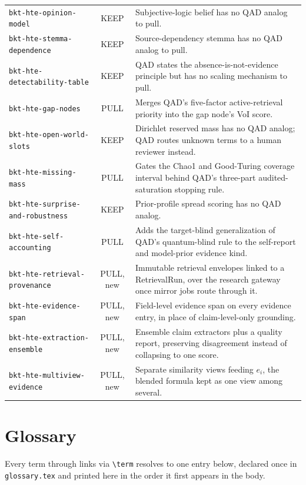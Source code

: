 \documentclass[11pt]{article}
\begin{document}
\begin{longtable}{@{}p{4.4cm}c p{7.7cm}@{}}
  \texttt{bkt-hte-opinion-model} & KEEP & Subjective-logic belief has no QAD analog to pull. \\
  \texttt{bkt-hte-stemma-dependence} & KEEP & Source-dependency stemma has no QAD analog to pull. \\
  \texttt{bkt-hte-detectability-table} & KEEP & QAD states the absence-is-not-evidence principle but has no scaling mechanism to pull. \\
  \texttt{bkt-hte-gap-nodes} & PULL & Merges QAD's five-factor active-retrieval priority into the gap node's VoI score. \\
  \texttt{bkt-hte-open-world-slots} & KEEP & Dirichlet reserved mass has no QAD analog; QAD routes unknown terms to a human reviewer instead. \\
  \texttt{bkt-hte-missing-mass} & PULL & Gates the Chao1 and Good-Turing coverage interval behind QAD's three-part audited-saturation stopping rule. \\
  \texttt{bkt-hte-surprise-and-robustness} & KEEP & Prior-profile spread scoring has no QAD analog. \\
  \texttt{bkt-hte-self-accounting} & PULL & Adds the target-blind generalization of QAD's quantum-blind rule to the self-report and model-prior evidence kind. \\
  \texttt{bkt-hte-retrieval-provenance} & PULL, new & Immutable retrieval envelopes linked to a RetrievalRun, over the research gateway once mirror jobs route through it. \\
  \texttt{bkt-hte-evidence-span} & PULL, new & Field-level evidence span on every evidence entry, in place of claim-level-only grounding. \\
  \texttt{bkt-hte-extraction-ensemble} & PULL, new & Ensemble claim extractors plus a quality report, preserving disagreement instead of collapsing to one score. \\
  \texttt{bkt-hte-multiview-evidence} & PULL, new & Separate similarity views feeding $e_i$, the blended formula kept as one view among several. \\
\end{longtable}

\section{Glossary}
\label{app:glossary}

Every term  through  links via
\texttt{\textbackslash term} resolves to one entry below, declared once
in \texttt{glossary.tex} and printed here in the order it first appears
in the body.
\end{document}

